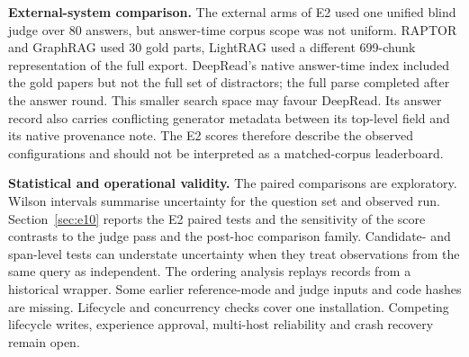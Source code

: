 \noindent\textbf{External-system comparison.} The external arms of E2 used
one unified blind judge over 80 answers, but answer-time corpus scope was
not uniform. RAPTOR and GraphRAG used 30 gold parts, LightRAG used a
different 699-chunk representation of the full export. DeepRead's native
answer-time index included the gold papers but not the full set of
distractors; the full parse completed after the answer round. This smaller
search space may favour DeepRead. Its answer record also carries conflicting
generator metadata between its top-level field and its native provenance
note. The E2 scores therefore describe the observed
configurations and should not be interpreted as a matched-corpus
leaderboard.

\noindent\textbf{Statistical and operational validity.} The paired
comparisons are exploratory. Wilson intervals summarise uncertainty for
the question set and observed run. Section~\ref{sec:e10} reports the E2
paired tests and the sensitivity of the score contrasts to the judge pass
and the post-hoc comparison family. Candidate- and span-level tests can
understate uncertainty when they treat observations from the same query as
independent. The ordering analysis replays records from a historical
wrapper. Some earlier reference-mode and judge inputs and code hashes are
missing. Lifecycle and concurrency checks cover one installation.
Competing lifecycle writes, experience approval, multi-host reliability
and crash recovery remain open.